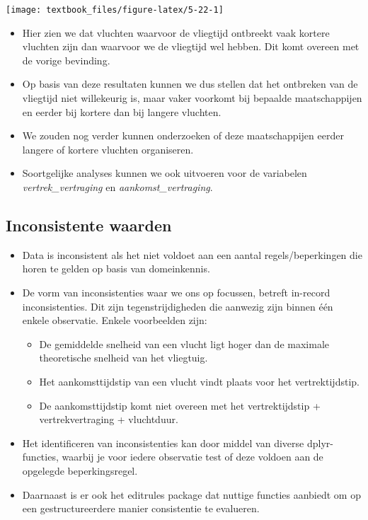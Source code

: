 \documentclass[]{tufte-book}
\providecommand{\tightlist}{%
  \setlength{\itemsep}{0pt}\setlength{\parskip}{0pt}}
\begin{document}
\texttt{[image: textbook\_files/figure-latex/5-22-1]}

\begin{itemize}
\tightlist
\item
  Hier zien we dat vluchten waarvoor de vliegtijd ontbreekt vaak kortere vluchten zijn dan waarvoor we de vliegtijd wel hebben. Dit komt overeen met de vorige bevinding.
\item
  Op basis van deze resultaten kunnen we dus stellen dat het ontbreken van de vliegtijd niet willekeurig is, maar vaker voorkomt bij bepaalde maatschappijen en eerder bij kortere dan bij langere vluchten.
\item
  We zouden nog verder kunnen onderzoeken of deze maatschappijen eerder langere of kortere vluchten organiseren.
\item
  Soortgelijke analyses kunnen we ook uitvoeren voor de variabelen \emph{vertrek\_vertraging} en \emph{aankomst\_vertraging}.
\end{itemize}

\hypertarget{inconsistente-waarden}{%
\subsection{Inconsistente waarden}\label{inconsistente-waarden}}

\begin{itemize}
\tightlist
\item
  Data is inconsistent als het niet voldoet aan een aantal regels/beperkingen die horen te gelden op basis van domeinkennis.
\item
  De vorm van inconsistenties waar we ons op focussen, betreft in-record inconsistenties. Dit zijn tegenstrijdigheden die aanwezig zijn binnen één enkele observatie. Enkele voorbeelden zijn:

  \begin{itemize}
  \tightlist
  \item
    De gemiddelde snelheid van een vlucht ligt hoger dan de maximale theoretische snelheid van het vliegtuig.
  \item
    Het aankomsttijdstip van een vlucht vindt plaats voor het vertrektijdstip.
  \item
    De aankomsttijdstip komt niet overeen met het vertrektijdstip + vertrekvertraging + vluchtduur.
  \end{itemize}
\item
  Het identificeren van inconsistenties kan door middel van diverse dplyr-functies, waarbij je voor iedere observatie test of deze voldoen aan de opgelegde beperkingsregel.
\item
  Daarnaast is er ook het editrules package dat nuttige functies aanbiedt om op een gestructureerdere manier consistentie te evalueren.
\end{itemize}
\end{document}
